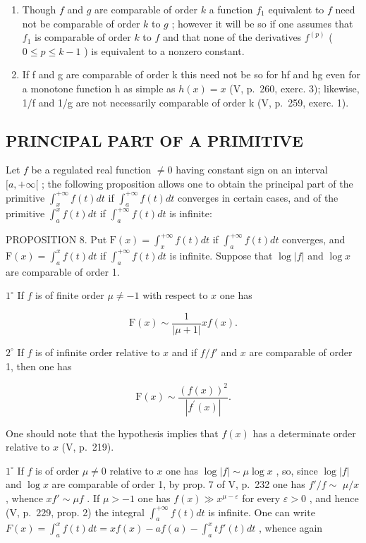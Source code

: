 \begin{enumerate}
\def\labelenumi{\arabic{enumi})}
\setcounter{enumi}{1}
\item
  Though \(f\) and \(g\) are comparable of order \(k\) a function \(f_{1}\) equivalent to \(f\) need not be comparable of order \(k\) to \(g\) ; however it will be so if one assumes that \(f_{1}\) is comparable of order \(k\) to \(f\) and that none of the derivatives \(f^{(p)}\) ( \(0 \leqslant p \leqslant k - 1\) ) is equivalent to a nonzero constant.
\item
  If f and g are comparable of order k this need not be so for hf and hg even for a monotone function h as simple as \(h(x) = x\) (V, p.~260, exerc. 3); likewise, 1/f and 1/g are not necessarily comparable of order k (V, p.~259, exerc. 1).
\end{enumerate}

\subsection{PRINCIPAL PART OF A PRIMITIVE}

Let \(f\) be a regulated real function \(\neq 0\) having constant sign on an interval \([a, +\infty[\) ; the following proposition allows one to obtain the principal part of the primitive \(\int_{x}^{+\infty} f(t) dt\) if \(\int_{a}^{+\infty} f(t) dt\) converges in certain cases, and of the primitive \(\int_{a}^{x} f(t) dt\) if \(\int_{a}^{+\infty} f(t) dt\) is infinite:

PROPOSITION 8. Put \(\mathrm{F}(x) = \int_{x}^{+\infty} f(t) dt\) if \(\int_{a}^{+\infty} f(t) dt\) converges, and \(\mathrm{F}(x) = \int_{a}^{x} f(t) dt\) if \(\int_{a}^{+\infty} f(t) dt\) is infinite. Suppose that \(\log |f|\) and \(\log x\) are comparable of order 1.

\(1^{\circ}\) If \(f\) is of finite order \(\mu \neq -1\) with respect to \(x\) one has

\[
\mathrm{F} (x) \sim \frac {1}{| \mu + 1 |} x f (x).\tag{1}
\]

\(2^{\circ}\) If \(f\) is of infinite order relative to \(x\) and if \(f / f'\) and \(x\) are comparable of order 1, then one has

\[
\mathrm{F} (x) \sim \frac {(f (x)) ^ {2}}{| f ^ {\prime} (x) |}.\tag{2}
\]

One should note that the hypothesis implies that \(f(x)\) has a determinate order relative to \(x\) (V, p.~219).

\(1^{\circ}\) If \(f\) is of order \(\mu \neq 0\) relative to \(x\) one has \(\log |f| \sim \mu \log x\) , so, since \(\log |f|\) and \(\log x\) are comparable of order 1, by prop. 7 of V, p.~232 one has \(f'/f \sim\) \(\mu/x\) , whence \(xf' \sim \mu f\) . If \(\mu > -1\) one has \(f(x) \gg x^{\mu-\varepsilon}\) for every \(\varepsilon > 0\) , and hence (V, p.~229, prop. 2) the integral \(\int_{a}^{+\infty} f(t) dt\) is infinite. One can write \(F(x) = \int_{a}^{x} f(t) dt = xf(x) - af(a) - \int_{a}^{x} tf'(t) dt\) , whence again


